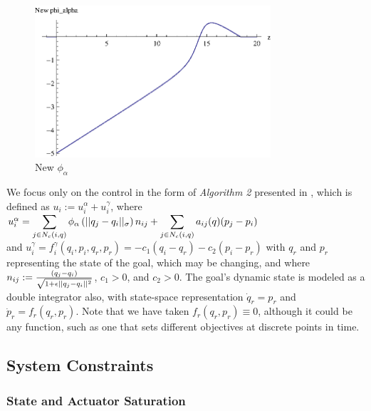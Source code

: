 \documentclass[10pt, conference]{IEEEtran}
\begin{document}
\begin{figure}[!b]
  \begin{center}
    \includegraphics[width=3.45in]{phiAlphaNew}
  \end{center}

  \caption{\small New $\phi_{\alpha}$}
  \label{fig:newPhiAlpha}
\end{figure}

We focus only on the control in the form of \textit{Algorithm 2} presented in \cite{os2006}, which is defined as $u_i := u_i^\alpha + u_i^\gamma$, where\\
$u_i^\alpha = \displaystyle\sum_{j \in N_c(i,q)}\phi_{\alpha}\left(\lvert\lvert q_j - q_i\rvert\rvert_{\sigma}\right)n_{ij} + \displaystyle\sum_{j \in N_c(i,q)}a_{ij}(q)(p_j - p_i)$\\
and
%
$u_i^\gamma = f_i^{\gamma}(q_i, p_i, q_r, p_r)=-c_1(q_i - q_r) - c_2(p_i - p_r)$ with $q_r$ and $p_r$ representing the state of the goal, which may be changing, and where $n_{ij} := \frac{\left(q_j - q_i\right)}{\sqrt{1 + \epsilon \lvert\lvert q_j - q_i\rvert\rvert^2}}$, $c_1 > 0$, and $c_2 > 0$.
%
The goal's dynamic state is modeled as a double integrator also, with state-space representation $\dot{q}_r = p_r$ and $\dot{p}_r = f_r(q_r, p_r)$.
%
Note that we have taken $f_r(q_r, p_r) \equiv 0$, although it could be any function, such as one that sets different objectives at discrete points in time.

\subsection{System Constraints}
\label{sec:constraints}

\subsubsection{State and Actuator Saturation}
\end{document}
